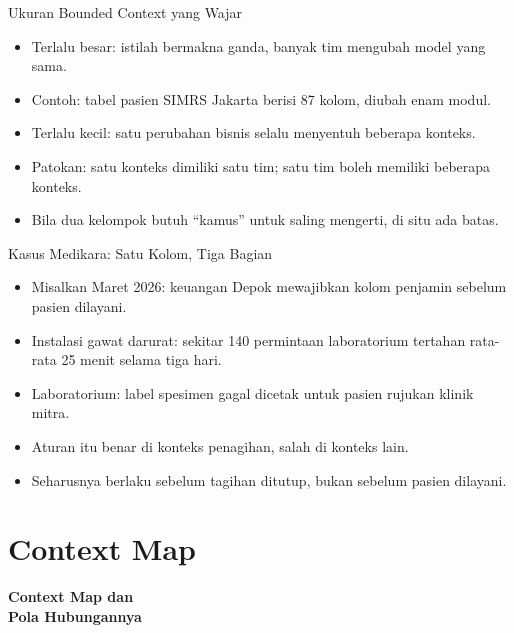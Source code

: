 \documentclass[aspectratio=169, table, 12pt]{beamer}
\begin{document}
\begin{frame}{{\Large Ukuran Bounded Context yang Wajar}}
  \vspace{10pt}
  \begin{itemize}
    \item Terlalu besar: istilah bermakna ganda, banyak tim mengubah model yang
          sama.
    \item Contoh: tabel pasien SIMRS Jakarta berisi 87 kolom, diubah enam modul.
    \item Terlalu kecil: satu perubahan bisnis selalu menyentuh beberapa konteks.
    \item Patokan: satu konteks dimiliki satu tim; satu tim boleh memiliki
          beberapa konteks.
    \item Bila dua kelompok butuh ``kamus'' untuk saling mengerti, di situ ada
          batas.
  \end{itemize}
\end{frame}

\begin{frame}{{\Large Kasus Medikara: Satu Kolom, Tiga Bagian}}
  \vspace{10pt}
  \begin{itemize}
    \item Misalkan Maret 2026: keuangan Depok mewajibkan kolom penjamin sebelum
          pasien dilayani.
    \item Instalasi gawat darurat: sekitar 140 permintaan laboratorium tertahan
          rata-rata 25 menit selama tiga hari.
    \item Laboratorium: label spesimen gagal dicetak untuk pasien rujukan klinik
          mitra.
    \item Aturan itu benar di konteks penagihan, salah di konteks lain.
    \item Seharusnya berlaku sebelum tagihan ditutup, bukan sebelum pasien
          dilayani.
  \end{itemize}
\end{frame}

\section{Context Map}

\begin{frame}{\hfill}
  \centering
  \Huge{\textbf{Context Map dan\\Pola Hubungannya}}
\end{frame}
\end{document}
